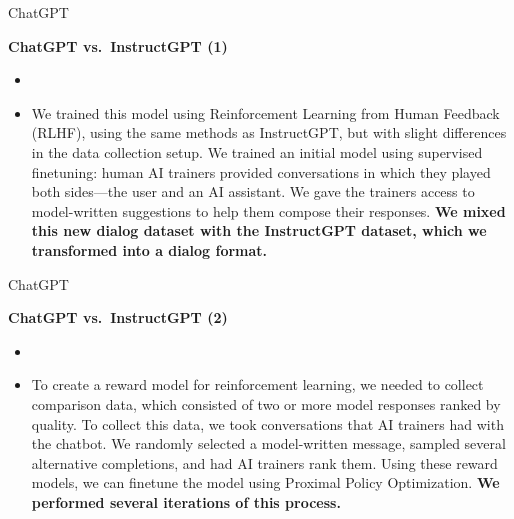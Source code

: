 \begin{vbframe}{ChatGPT}

\vfill

\textbf{ChatGPT vs.\ InstructGPT (1)}

	\begin{itemize}
		\item \href{https://openai.com/blog/chatgpt}{}
		\item
                We trained this model using Reinforcement
		Learning from Human Feedback (RLHF), using
		the same methods as InstructGPT, but with
		slight differences in the data collection
		setup. We trained an initial model using
		supervised finetuning: human AI trainers
		provided conversations in which they played
		both sides—the user and an AI assistant. We
		gave the trainers access to model-written
		suggestions to help them compose their
		responses. \textbf{We mixed this new dialog
		dataset with the InstructGPT dataset, which
		we transformed into a dialog format.}
	\end{itemize}

\vfill

\end{vbframe}

\begin{vbframe}{ChatGPT}

\vfill

\textbf{ChatGPT vs.\ InstructGPT (2)}

	\begin{itemize}
		\item \href{https://openai.com/blog/chatgpt}{}
		\item
To create a reward model for reinforcement learning, we
		needed to collect comparison data, which
		consisted of two or more model responses
		ranked by quality. To collect this data, we
		took conversations that AI trainers had with
		the chatbot. We randomly selected a
		model-written message, sampled several
		alternative completions, and had AI trainers
		rank them. Using these reward models, we can
		finetune the model using Proximal Policy
		Optimization. \textbf{We performed several
		iterations of this process.}
	\end{itemize}

\vfill

\end{vbframe}


